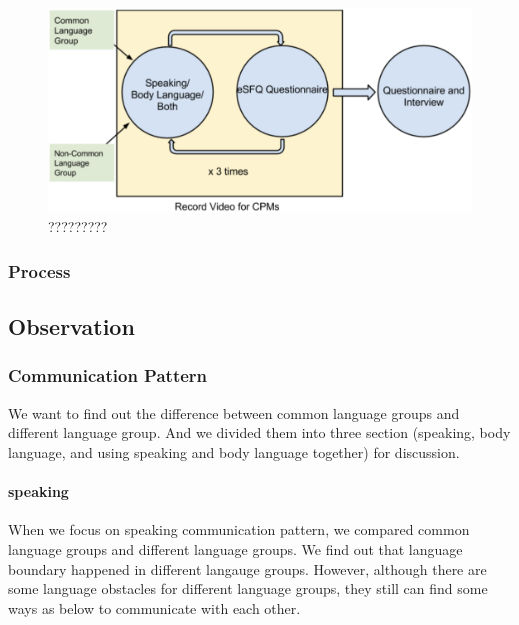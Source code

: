 \begin{figure}[!h]
\centering
\includegraphics[width=0.9\columnwidth]{Figures/US_F1.png}
\caption{?????????}
\label{fig:US1}
\end{figure}



\subsubsection{Process}
\subsection{Observation}
\subsubsection{Communication Pattern}
We want to find out the difference between common language groups and different language group. And we divided them into three section (speaking, body language, and using speaking and body language together) for discussion.

\paragraph{speaking}
When we focus on speaking communication pattern, we compared common language groups and different language groups. We find out that language boundary happened in different langauge groups. However, although there are some language obstacles for different language groups, they still can find some ways as below to communicate with each other.

